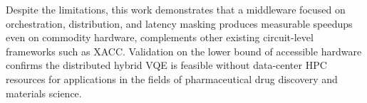 \documentclass[12pt, letterpaper]{article}
\begin{document}
Despite the limitations, this work demonstrates that a middleware focused on orchestration, 
distribution, and latency masking produces measurable speedups even on commodity hardware,  
complements other existing circuit-level frameworks such as XACC. Validation on the lower bound of accessible hardware confirms the 
distributed hybrid VQE is feasible without data-center HPC resources for applications in the fields of pharmaceutical 
drug discovery and materials science.
\end{document}

